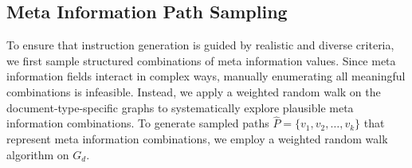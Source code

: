 



\subsection{Meta Information Path Sampling}
To ensure that instruction generation is guided by realistic and diverse criteria, we first sample structured combinations of meta information values. Since meta information fields interact in complex ways, manually enumerating all meaningful combinations is infeasible. Instead, we apply a weighted random walk on the document-type-specific graphs to systematically explore plausible meta information combinations.
To generate sampled paths $\hat{P} = \{ v_1, v_2, \dots, v_k \}$ that represent meta information combinations, we employ a weighted random walk algorithm on $G_d$. 

